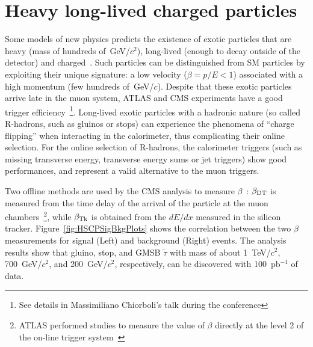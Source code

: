 \documentclass{cmspaper}
\begin{document}
\section{Heavy long-lived charged particles} \label{HSCP}
Some models of new physics predicts the existence 
of exotic particles that are heavy (mass of hundreds of~GeV/$c^2$), 
long-lived (enough to decay outside of the detector) and charged~\cite{Fairbairn:2006gg}. 
Such particles can be distinguished from SM particles
by exploiting their unique signature: a low velocity ($\beta=p/E<1$) 
associated with a high momentum (few hundreds of~GeV/$c$).
Despite that these exotic particles arrive late in the muon system, 
ATLAS and CMS experiments have a good trigger efficiency~\footnote{See details 
in Massimiliano Chiorboli's talk during the conference}.
Long-lived exotic particles with a hadronic nature 
(so called R-hadrons, such as gluinos or stops) 
can experience the phenomena of ``charge flipping'' when interacting 
in the calorimeter, thus complicating their online selection. 
For the online selection of R-hadrons, 
the calorimeter triggers (such as missing transverse energy, 
transverse energy sums or jet triggers) show good performances, 
and represent a valid alternative to the muon triggers.

Two offline methods are used by the 
CMS analysis to measure $\beta$~\cite{HSCP}:
$\beta_{{\rm DT}}$ is measured from the time delay of the arrival of the particle
at the muon chambers~\footnote{ATLAS performed studies to measure 
the value of $\beta$ directly at the level 2 of the on-line 
trigger system~\cite{Aad:2009wy}}, while $\beta_{{\rm Tk}}$ 
is obtained from the $dE/dx$ measured in the silicon tracker. 
Figure~\ref{fig:HSCPSigBkgPlots} shows the correlation between 
the two $\beta$ measurements for signal (Left) 
and background (Right) events. The analysis results show that 
gluino, stop, and GMSB $\tilde{\tau}$  with mass of about 
1~TeV/$c^2$, 700~GeV/$c^2$, and 200~GeV/$c^2$, 
respectively, can be discovered with 100~pb$^{-1}$ of data.
\end{document}
